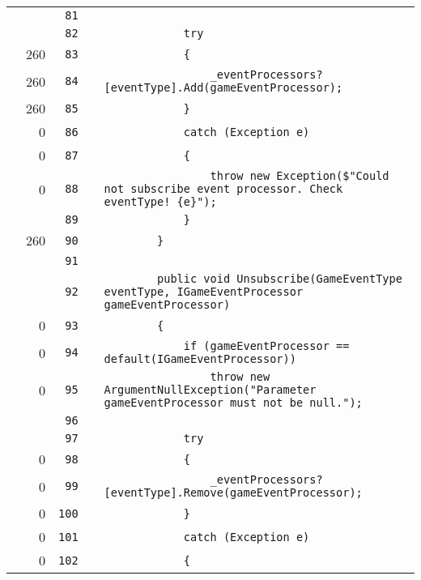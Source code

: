 \documentclass[a4paper,landscape,10pt]{article}
\begin{document}
\begin{longtable}[l]{lrrll}
\cellcolor{gray} &  & \verb~81~ & & \verb~~\\
\cellcolor{gray} &  & \verb~82~ & & \verb~            try~\\
\cellcolor{green} & 260 & \verb~83~ & & \verb~            {~\\
\cellcolor{orange} & 260 & \verb~84~ & & \verb~                _eventProcessors?[eventType].Add(gameEventProcessor);~\\
\cellcolor{green} & 260 & \verb~85~ & & \verb~            }~\\
\cellcolor{red} & 0 & \verb~86~ & & \verb~            catch (Exception e)~\\
\cellcolor{red} & 0 & \verb~87~ & & \verb~            {~\\
\cellcolor{red} & 0 & \verb~88~ & & \verb~                throw new Exception($"Could not subscribe event processor. Check eventType! {e}");~\\
\cellcolor{gray} &  & \verb~89~ & & \verb~            }~\\
\cellcolor{green} & 260 & \verb~90~ & & \verb~        }~\\
\cellcolor{gray} &  & \verb~91~ & & \verb~~\\
\cellcolor{gray} &  & \verb~92~ & & \verb~        public void Unsubscribe(GameEventType eventType, IGameEventProcessor gameEventProcessor)~\\
\cellcolor{red} & 0 & \verb~93~ & & \verb~        {~\\
\cellcolor{red} & 0 & \verb~94~ & & \verb~            if (gameEventProcessor == default(IGameEventProcessor))~\\
\cellcolor{red} & 0 & \verb~95~ & & \verb~                throw new ArgumentNullException("Parameter gameEventProcessor must not be null.");~\\
\cellcolor{gray} &  & \verb~96~ & & \verb~~\\
\cellcolor{gray} &  & \verb~97~ & & \verb~            try~\\
\cellcolor{red} & 0 & \verb~98~ & & \verb~            {~\\
\cellcolor{red} & 0 & \verb~99~ & & \verb~                _eventProcessors?[eventType].Remove(gameEventProcessor);~\\
\cellcolor{red} & 0 & \verb~100~ & & \verb~            }~\\
\cellcolor{red} & 0 & \verb~101~ & & \verb~            catch (Exception e)~\\
\cellcolor{red} & 0 & \verb~102~ & & \verb~            {~\\

\end{longtable}
\end{document}
